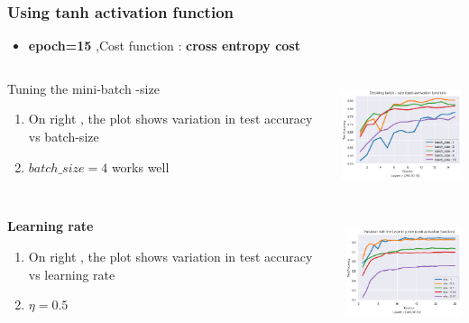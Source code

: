 \documentclass[12pt,t]{beamer}
\begin{document}
\begin{frame}
    \frametitle{Using tanh activation function}

    \scriptsize

    \begin{itemize}
        \item \textbf{epoch=15} ,Cost function : \textbf{cross entropy cost }
    \end{itemize}

     \begin{columns}
        \begin{column}[T]{0.4\linewidth}
            \begin{block}{Tuning the mini-batch -size }
                \begin{enumerate}
                    \item On right , the plot shows variation in test accuracy vs batch-size
                    \item $batch\_size =4$  works well
                \end{enumerate}
            \end{block}
        \end{column}
        \begin{column}[T]{0.6\linewidth}
            \includegraphics[width=\linewidth,height=90pt]{tanh/batch_size.png}
        \end{column}
    \end{columns}
      \begin{columns}
        \begin{column}[T]{0.4\linewidth}
            \textbf{Learning rate}
                \begin{enumerate}
                    \item On right , the plot shows variation in test accuracy vs learning rate
                    \item $\eta =0.5$ 
                \end{enumerate}
        \end{column}
        \begin{column}[T]{0.6\linewidth}
            \includegraphics[width=\linewidth,height=90pt]{tanh/variation_eta.png}
        \end{column}
    \end{columns}

\end{frame}
\end{document}
